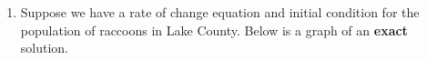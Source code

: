 \begin{enumerate}
\begin{enumerate}
\end{enumerate}

\clearpage

\item	Suppose we have a rate of change equation and initial condition for the population of raccoons in Lake County. Below is a graph of an \textbf{exact} solution. \label{03HWproblem3}


\end{enumerate}
